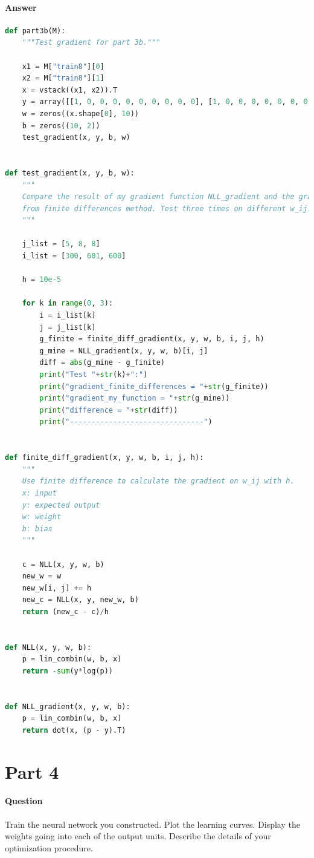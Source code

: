 \documentclass[11pt,twoside]{article}
\begin{document}
\paragraph{Answer}
\begin{lstlisting}[language=Python]
def part3b(M):
    """Test gradient for part 3b."""
    
    x1 = M["train8"][0]
    x2 = M["train8"][1]
    x = vstack((x1, x2)).T
    y = array([[1, 0, 0, 0, 0, 0, 0, 0, 0, 0], [1, 0, 0, 0, 0, 0, 0, 0, 0, 0]]).T
    w = zeros((x.shape[0], 10))
    b = zeros((10, 2))
    test_gradient(x, y, b, w)


def test_gradient(x, y, b, w):
    """
    Compare the result of my gradient function NLL_gradient and the gradient get 
    from finite differences method. Test three times on different w_ij.
    """
    
    j_list = [5, 8, 8]
    i_list = [300, 601, 600]
    
    h = 10e-5
    
    for k in range(0, 3):
        i = i_list[k]
        j = j_list[k]
        g_finite = finite_diff_gradient(x, y, w, b, i, j, h)
        g_mine = NLL_gradient(x, y, w, b)[i, j]
        diff = abs(g_mine - g_finite)
        print("Test "+str(k)+":")
        print("gradient_finite_differences = "+str(g_finite))
        print("gradient_my_function = "+str(g_mine))
        print("difference = "+str(diff))
        print("-------------------------------")    


def finite_diff_gradient(x, y, w, b, i, j, h):
    """
    Use finite difference to calculate the gradient on w_ij with h.
    x: input
    y: expected output
    w: weight
    b: bias
    """
    
    c = NLL(x, y, w, b) 
    new_w = w
    new_w[i, j] += h
    new_c = NLL(x, y, new_w, b) 
    return (new_c - c)/h


def NLL(x, y, w, b):
    p = lin_combin(w, b, x)
    return -sum(y*log(p)) 
    
    
def NLL_gradient(x, y, w, b):
    p = lin_combin(w, b, x)
    return dot(x, (p - y).T)
\end{lstlisting}

\clearpage

\section*{Part 4}
\paragraph{Question}
Train the neural network you constructed. Plot the learning curves. Display the weights going into each of the output units. Describe the details of your optimization procedure.
\end{document}
